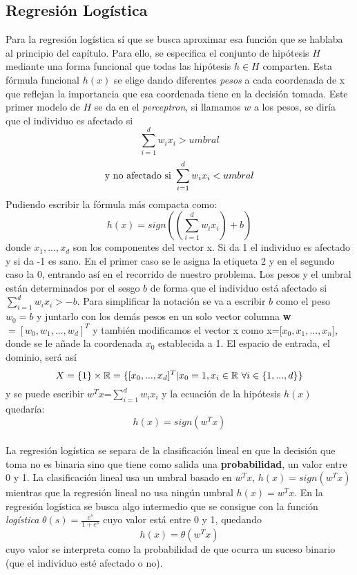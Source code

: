 \subsection{Regresión Logística}
Para la regresión logística sí que se busca aproximar esa función que se hablaba al principio del capítulo. Para ello, se especifica el conjunto de hipótesis $H$ mediante una forma funcional que todas las hipótesis $h \in H$  comparten. Esta fórmula funcional $h(x)$ se elige dando diferentes \textit{pesos} a cada coordenada de x que reflejan la importancia que esa coordenada tiene en la decisión tomada. Este primer modelo de $H$ se da en el \textit{perceptron}, si llamamos $w$ a los pesos, se diría que el individuo es afectado si \[ \sum_{i=1}^{d}w_{i}x_{i} > umbral \]
\[ \textnormal{y no afectado si } \sum_{i=1}^{d}w_{i}x_{i} < umbral \]
Pudiendo escribir la fórmula más compacta como:
\[ h(x)=sign((\sum_{i=1}^{d}w_{i}x_{i})+b) \]
donde $x_{1},...,x_{d}$ son los componentes del vector x. Si da 1 el individuo es afectado y si da -1 es sano. En el primer caso se le asigna la etiqueta 2 y en el segundo caso la 0, entrando así en el recorrido de nuestro problema. Los pesos y el umbral están determinados por el sesgo $b$ de forma que el individuo está afectado si $\sum_{i=1}^{d} w_{i}x_{i} > -b$. Para simplificar la notación se va a escribir $b$ como el peso $w_{0}=b$ y juntarlo con los demás pesos en un solo vector columna \textbf{w}$=[w_{0},w_{1},...,w_{d}]^{T}$ y también modificamos el vector x como x=[$x_{0},x_{1},...,x_{n}$], donde se le añade la coordenada $x_{0}$ establecida a 1. El espacio de entrada, el dominio, será así
\[ X = \lbrace 1 \rbrace \times \mathbb{R} = \lbrace [x_{0},...,x_{d}]^{T} \vert x_{0}=1, x_{i} \in \mathbb{R} \textnormal{ } \forall i \in \lbrace 1,...,d \rbrace \rbrace\]
y se puede escribir \textbf{$w^{T}x$}=$\sum_{i=1}^{d} w_{i}x_{i}$ y la ecuación de la hipótesis $h(x)$ quedaría:
\[ h(x) = sign(w^{T}x) \]
\cite{abu2012learning}\\
La regresión logística se separa de la clasificación lineal en que la decisión que toma no es binaria sino que tiene como salida una \textbf{probabilidad}, un valor entre 0 y 1. La clasificación lineal usa un umbral basado en $w^{T}x$, $h(x) = sign(w^{T}x)$ mientras que la regresión lineal no usa ningún umbral $h(x) =w^{T}x$. En la regresión logística se busca algo intermedio que se consigue con la función \textit{logística} $\theta(s)=\frac{e^{s}}{1+e^{s}}$ cuyo valor está entre 0 y 1, quedando \[ h(x)=\theta(w^{T}x) \] cuyo valor se interpreta como la probabilidad de que ocurra un suceso binario (que el individuo esté afectado o no).





\endinput












